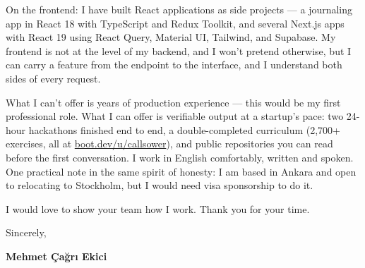 \documentclass[11pt,a4paper]{article}
\begin{document}
On the frontend: I have built React applications as side projects --- a journaling app in React 18 with TypeScript and Redux Toolkit, and several Next.js apps with React 19 using React Query, Material UI, Tailwind, and Supabase. My frontend is not at the level of my backend, and I won't pretend otherwise, but I can carry a feature from the endpoint to the interface, and I understand both sides of every request.

What I can't offer is years of production experience --- this would be my first professional role. What I can offer is verifiable output at a startup's pace: two 24-hour hackathons finished end to end, a double-completed curriculum (2,700+ exercises, all at \href{https://www.boot.dev/u/callsower}{boot.dev/u/callsower}), and public repositories you can read before the first conversation. I work in English comfortably, written and spoken. One practical note in the same spirit of honesty: I am based in Ankara and open to relocating to Stockholm, but I would need visa sponsorship to do it.

I would love to show your team how I work. Thank you for your time.

Sincerely,

\textbf{Mehmet Çağrı Ekici}
\end{document}
